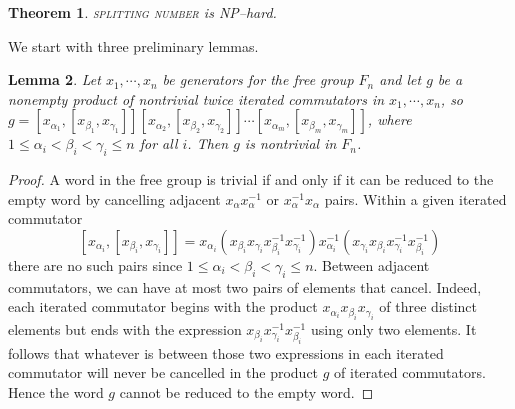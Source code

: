 \documentclass[12pt]{amsart}
\newtheorem{thm}{Theorem}
\newtheorem{lemma}[thm]{Lemma}
\theoremstyle{definition}
\theoremstyle{remark}
\begin{document}
\begin{thm}
\textsc{splitting number} is NP--hard.
\label{thm_splitting}
\end{thm}

 We start with three preliminary lemmas.

\begin{lemma}
Let $x_1, \cdots , x_n$ be generators for the free group $F_n$ and let $g$ be a nonempty product of nontrivial twice iterated commutators in $x_1, \cdots, x_n$, so $g = [x_{\alpha_1}, [ x_{\beta_1}, x_{\gamma_1}]][x_{\alpha_2}, [ x_{\beta_2}, x_{\gamma_2}]] \cdots  [x_{\alpha_m}, [ x_{\beta_m}, x_{\gamma_m}]]$, where $1 \le \alpha_i < \beta_i < \gamma_i \le n$ for all $i$.
Then $g$ is nontrivial in $F_n$.
\label{lem_freeword}
\end{lemma}

\begin{proof}
A word in the free group is trivial if and only if it can be reduced to the empty word by cancelling adjacent $x_\alpha x_\alpha^{-1}$ or $x_\alpha^{-1}x_\alpha$ pairs.
Within a given iterated commutator $$[x_{\alpha_i}, [ x_{\beta_i}, x_{\gamma_i}]]  = x_{\alpha_i}(x_{\beta_i}x_{\gamma_i}x_{\beta_i}^{-1}x_{\gamma_i}^{-1})x_{\alpha_i}^{-1}(x_{\gamma_i}x_{\beta_i}x_{\gamma_i}^{-1}x_{\beta_i}^{-1})$$ there are no such pairs since $1 \le \alpha_i < \beta_i < \gamma_i \le n$.
Between adjacent commutators, we can have at most two pairs of elements that cancel.
Indeed, each iterated commutator begins with the product $x_{\alpha_i}x_{\beta_i}x_{\gamma_i}$ of three distinct elements but ends with the expression $x_{\beta_i}x_{\gamma_i}^{-1}x_{\beta_i}^{-1}$ using only two elements.
It follows that whatever is between those two expressions in each iterated commutator will never be cancelled in the product $g$ of iterated commutators.
Hence the word $g$ cannot be reduced to the empty word.
\end{proof}
\end{document}
